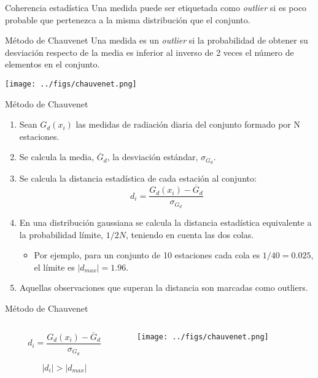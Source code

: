 \documentclass[aspectratio=169, usenames,svgnames,dvipsnames]{beamer}
\begin{document}
\begin{frame}[label={sec:orgfa9f551}]{Coherencia estadística}
Una medida puede ser etiquetada como \emph{outlier} si es poco probable que pertenezca a la misma distribución que el conjunto.
\begin{block}{\alert{Método de Chauvenet}}
Una medida es un \emph{outlier} si la probabilidad de obtener su desviación
respecto de la media es inferior al inverso de 2 veces el número de
elementos en el conjunto.
\begin{center}
\texttt{[image: ../figs/chauvenet.png]}
\end{center}
\end{block}
\end{frame}

\begin{frame}[label={sec:org4a49d6e}]{Método de Chauvenet}
\begin{enumerate}
\item Sean \(G_d(x_i)\) las medidas de radiación diaria del conjunto formado por N estaciones.
\item Se calcula la media, \(\overline{G}_d\), la desviación estándar, \(\sigma_{G_d}\).
\item Se calcula la distancia estadística de cada estación al conjunto:
\[
d_i = \frac{G_d(x_i) - \overline{G}_d}{\sigma_{G_d}}
\]

\item En una distribución gaussiana se calcula la distancia estadística
equivalente a la probabilidad límite, \(1/2N\), teniendo en cuenta
las dos colas.
\begin{itemize}
\item Por ejemplo, para un conjunto de 10 estaciones cada cola es
\(1/40 = 0.025\), el límite es \(\left| d_{max} \right| = 1.96\).
\end{itemize}

\item Aquellas observaciones que superan la distancia son marcadas como outliers.
\end{enumerate}

\nocite{Perpinan2009}
\end{frame}

\begin{frame}[label={sec:org083d9aa}]{Método de Chauvenet}
\begin{columns}
\begin{column}{0.3\columnwidth}
\[
d_i = \frac{G_d(x_i) - \overline{G}_d}{\sigma_{G_d}}
\]

\[
\left| d_i \right| > \left| d_{max} \right|
\]
\end{column}

\begin{column}{0.8\columnwidth}
\begin{center}
\begin{center}
\texttt{[image: ../figs/chauvenet.png]}
\end{center}
\end{center}
\end{column}
\end{columns}
\end{frame}
\end{document}
